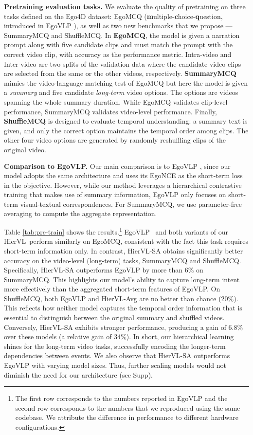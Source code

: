 \documentclass[10pt,twocolumn,letterpaper]{article}
\newcommand{\KAcamera}[1]{{\color{black}{}#1}}
\newcommand{\modelname}[0]{{HierVL}}
\begin{document}
\noindent \textbf{Pretraining evaluation tasks.}
We evaluate the quality of pretraining on three tasks defined on the Ego4D dataset: EgoMCQ (\textbf{m}ultiple-\textbf{c}hoice-\textbf{q}uestion, introduced in EgoVLP \cite{egovlp}), as well as two new benchmarks that we propose --- SummaryMCQ and ShuffleMCQ.  In \textbf{EgoMCQ}, the  model is given a narration prompt along with five candidate clips and must match the prompt with the correct video clip, with accuracy as the performance metric. Intra-video and Inter-video are two splits of the validation data where the candidate video clips are selected from the same or the other videos, respectively. \textbf{SummaryMCQ} mimics the video-language matching test of EgoMCQ but here the model is given a \emph{summary} and five candidate \emph{long-term} video options. The options are videos spanning the whole summary duration. While EgoMCQ validates clip-level performance, SummaryMCQ validates video-level performance. Finally, \textbf{ShuffleMCQ} is designed to evaluate temporal understanding: a summary text is given, and only the correct option maintains the temporal order among clips. The other four video options are generated by randomly reshuffling clips of the original video.


\noindent \textbf{Comparison to EgoVLP.} Our main comparison is to EgoVLP \cite{egovlp}, since our model adopts the same architecture and uses its EgoNCE as the short-term loss in the objective.
However, while our method leverages a hierarchical contrastive training that makes use of summary information, EgoVLP only focuses on short-term visual-textual correspondences. For SummaryMCQ, we use parameter-free averaging to compute the aggregate representation. 

Table \ref{tab:pre-train} shows the results.\footnote{The first row corresponds to the numbers reported in EgoVLP \cite{egovlp} and the second row corresponds to the numbers that we reproduced using the same codebase. We attribute the difference in performance to different hardware configurations.} EgoVLP~\cite{egovlp} and both variants of our \modelname~perform similarly on EgoMCQ, consistent with the fact this task requires short-term information only. In contrast, \modelname-SA obtains significantly better accuracy on the video-level (long-term) tasks, SummaryMCQ and ShuffleMCQ. Specifically, \modelname-SA outperforms EgoVLP by more than $6\%$  on SummaryMCQ. This highlights our model's ability to capture long-term intent more effectively than the aggregated short-term features of EgoVLP. On ShuffleMCQ, both EgoVLP and \modelname-Avg are no better than chance (20\%). This reflects how neither model captures the temporal order information that is essential to distinguish between the original summary and shuffled videos. Conversely, \modelname-SA exhibits stronger performance, producing a gain of 6.8\% over these models (a relative gain of 34\%).   In short, our hierarchical learning shines for the long-term video tasks, successfully encoding the longer-term dependencies between events. \KAcamera{We also observe that HierVL-SA outperforms EgoVLP with varying model sizes. Thus, further scaling models would not diminish the need for our architecture (see Supp).}
\end{document}
